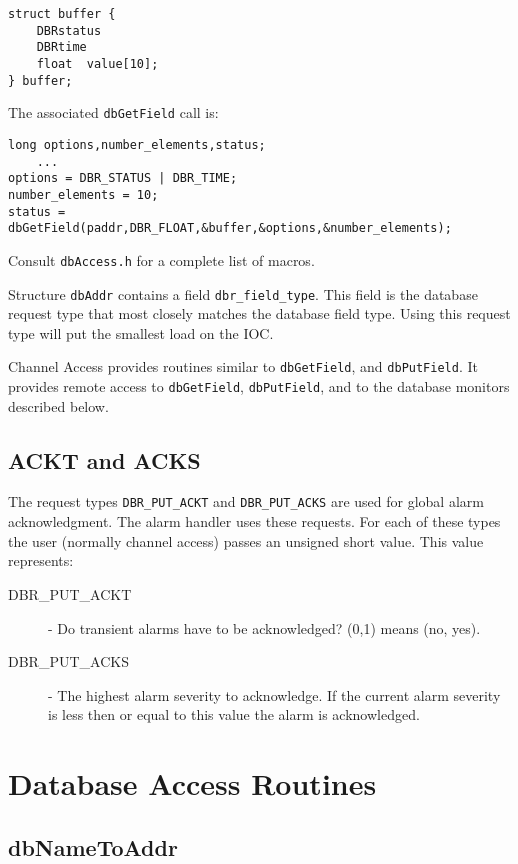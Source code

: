 \begin{verbatim}struct buffer {
    DBRstatus
    DBRtime
    float  value[10];
} buffer;
\end{verbatim}The associated \verb|dbGetField| call is:

\begin{verbatim}
long options,number_elements,status;
    ...
options = DBR_STATUS | DBR_TIME;
number_elements = 10;
status = dbGetField(paddr,DBR_FLOAT,&buffer,&options,&number_elements);
\end{verbatim}Consult \verb|dbAccess.h| for a complete list of macros.

Structure \verb|dbAddr| contains a field \verb|dbr_field_type|. This field is the database request type that most closely matches 
the database field type. Using this request type will put the smallest load on the IOC.

Channel Access provides routines similar to \verb|dbGetField|, and \verb|dbPutField|. It provides remote access to 
\verb|dbGetField|, \verb|dbPutField|, and to the database monitors described below.

\subsection{ACKT and ACKS}

The request types \verb|DBR_PUT_ACKT| and \verb|DBR_PUT_ACKS| are used for global alarm acknowledgment. The alarm handler 
uses these requests. For each of these types the user (normally channel access) passes an unsigned short value. This value 
represents:

\begin{description}

\item[DBR\_PUT\_ACKT]  - Do transient alarms have to be acknowledged? (0,1) means (no, yes).

\item[DBR\_PUT\_ACKS] - The highest alarm severity to acknowledge. If the current alarm severity is less then or equal to this 
value the alarm is acknowledged.

\end{description}

\section{Database Access Routines}

\subsection{dbNameToAddr}

